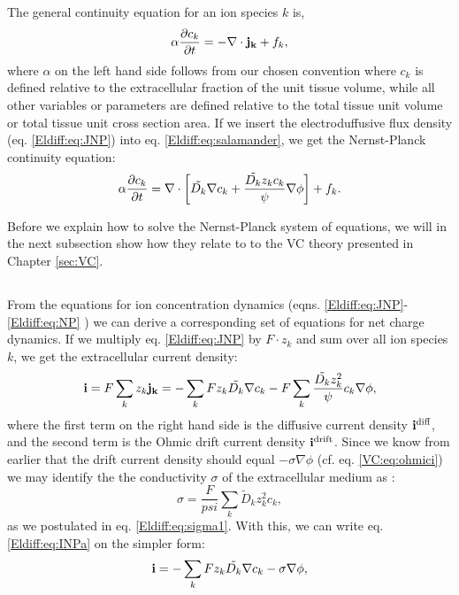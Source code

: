 The general continuity equation for an ion species $k$ is,
\begin{equation}
\alpha \frac{\partial c_k}{\partial t} = - \nabla \cdot {\bf j_k} + f_k,
\label{Eldiff:eq:salamander}
\end{equation}
where $\alpha$ on the left hand side follows from our chosen convention where $c_k$ is defined relative to the extracellular fraction of the unit tissue volume, while all other variables or parameters are defined relative to the total tissue unit volume or total tissue unit cross section area. If we insert the electroduffusive flux density (eq. \ref{Eldiff:eq:JNP}) into eq. \ref{Eldiff:eq:salamander},
we get the Nernst-Planck continuity equation:
\begin{equation}
\alpha \frac{\partial c_k}{\partial t} = {\bf \nabla} \cdot \left[ \tilde{D_k} {\bf \nabla} c_k + \frac{\tilde{D_k} z_k c_k}{\psi} {\bf \nabla} \phi \right] + f_k.
\label{Eldiff:eq:NP}
\end{equation}

Before we explain how to solve the Nernst-Planck system of equations, we will in the next subsection show how they relate to to the VC theory presented in Chapter \ref{sec:VC}.


\subsection{}
\label{sec:Eldiff:electrodynamics}
From the equations for ion concentration dynamics (eqns. \ref{Eldiff:eq:JNP}-\ref{Eldiff:eq:NP} ) we can derive a corresponding set of equations for net charge dynamics. If we multiply eq. \ref{Eldiff:eq:JNP} by $F\cdot z_k$ and sum over all ion species $k$, we get the extracellular current density:
\begin{equation}
{\bf i} = F\sum_k {z_k {\bf j_k}} = -\sum_k{F z_k \tilde{D_k}{\bf \nabla} c_{k}} - F\sum_{k} \frac{\tilde{D_k} z_{k}^2}{\psi}c_{k} {\bf \nabla}{\phi}, 
\label{Eldiff:eq:INPa}
\end{equation}
where the first term on the right hand side is the diffusive current density ${\bf i^\text{diff}}$, and the second term is the Ohmic drift current density ${\bf i^\text{drift}}$. Since we know from earlier that the drift current density should equal $- \sigma \nabla \phi$  (cf. eq. \ref{VC:eq:ohmici}) we may identify the the conductivity $\sigma$ of the extracellular medium as \citep{Koch1999}:
\begin{equation}
\sigma = \frac{F}{psi}\sum_{k} \tilde{D}_k z_{k}^2 c_{k},
\label{Eldiff:eq:sigma}
\end{equation}
as we postulated in eq. \ref{Eldiff:eq:sigma1}. With this, we can write eq. \ref{Eldiff:eq:INPa} on the simpler form:
\begin{equation}
{\bf i} = - \sum_k{F z_k \tilde{D_k}{\bf \nabla} c_{k}} - \sigma{\bf \nabla}{\phi},
\label{Eldiff:eq:INP}
\end{equation}

